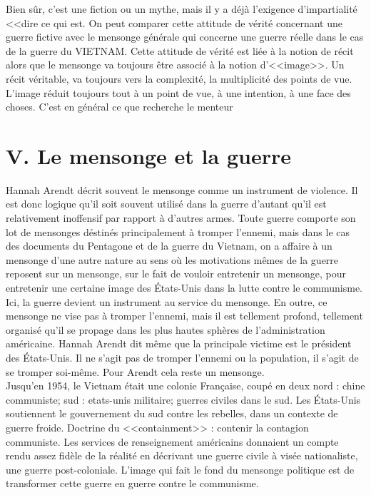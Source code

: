 \documentclass[12pt]{article}
\begin{document}
Bien sûr, c'est une fiction ou un mythe, mais il y a déjà l'exigence d'impartialité <<dire ce qui est.
On peut comparer cette attitude de vérité concernant une guerre fictive avec le mensonge générale qui concerne une guerre réelle dans le cas de la guerre du VIETNAM.
Cette attitude de vérité est liée à la notion de récit alors que le mensonge va toujours être associé à la notion d'<<image>>.
Un récit véritable, va toujours vers la complexité, la multiplicité des points de vue.
L'image réduit toujours tout à un point de vue, à une intention, à une face des choses.
C'est en général ce que recherche le menteur 
\section*{\color{red}V. Le mensonge et la guerre}
Hannah Arendt décrit souvent le mensonge comme un instrument de violence.
Il est donc logique qu'il soit souvent utilisé dans la guerre d'autant qu'il est relativement inoffensif par rapport à d'autres armes.
Toute guerre comporte son lot de mensonges déstinés principalement à tromper l'ennemi, mais dans le cas des documents du Pentagone et de la guerre du Vietnam, on a affaire à un mensonge d'une autre nature au sens où les motivations mêmes de la guerre reposent sur un mensonge, sur le fait de vouloir entretenir un mensonge, pour entretenir une certaine image des États-Unis dans la lutte contre le communisme.
Ici, la guerre devient un instrument au service du mensonge.
En outre, ce mensonge ne vise pas à tromper l'ennemi, mais il est tellement profond, tellement organisé qu'il se propage dans les plus hautes sphères de l'administration américaine.
Hannah Arendt dit même que la principale victime est le président des États-Unis.
Il ne s'agit pas de tromper l'ennemi ou la population, il s'agit de se tromper soi-même.
Pour Arendt cela reste  un mensonge.\\[0.5cm]
Jusqu'en 1954, le Vietnam était une colonie Française, coupé en deux nord : chine communiste; sud : etats-unis militaire; guerres civiles dans le sud. Les États-Unis soutiennent le gouvernement du sud contre les rebelles, dans un contexte de guerre froide.
Doctrine du <<containment>> : contenir la contagion communiste. Les services de renseignement américains donnaient un compte rendu assez fidèle de la réalité en décrivant une guerre civile à visée nationaliste, une guerre post-coloniale.
L'image qui fait le fond du mensonge politique est de transformer cette guerre en guerre contre le communisme.
\end{document}
